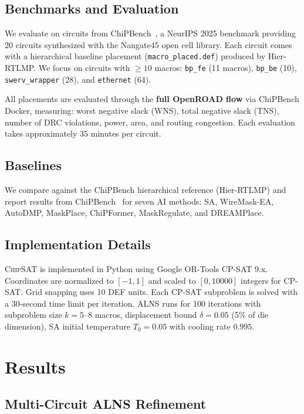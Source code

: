 \documentclass[sigconf,anonymous,review,9pt]{acmart}
\begin{document}
\subsection{Benchmarks and Evaluation}

We evaluate on circuits from ChiPBench~\cite{chipbench2025}, a NeurIPS 2025 benchmark providing 20 circuits synthesized with the Nangate45 open cell library. Each circuit comes with a hierarchical baseline placement (\texttt{macro\_placed.def}) produced by Hier-RTLMP. We focus on circuits with $\geq 10$ macros: \texttt{bp\_fe} (11 macros), \texttt{bp\_be} (10), \texttt{swerv\_wrapper} (28), and \texttt{ethernet} (64).

All placements are evaluated through the \textbf{full OpenROAD flow} via ChiPBench Docker, measuring: worst negative slack (WNS), total negative slack (TNS), number of DRC violations, power, area, and routing congestion. Each evaluation takes approximately 35 minutes per circuit.

\subsection{Baselines}

We compare against the ChiPBench hierarchical reference (Hier-RTLMP) and report results from ChiPBench~\cite{chipbench2025} for seven AI methods: SA, WireMask-EA, AutoDMP, MaskPlace, ChiPFormer, MaskRegulate, and DREAMPlace.

\subsection{Implementation Details}

\textsc{ChipSAT} is implemented in Python using Google OR-Tools CP-SAT 9.x. Coordinates are normalized to $[-1, 1]$ and scaled to $[0, 10000]$ integers for CP-SAT. Grid snapping uses 10 DEF units. Each CP-SAT subproblem is solved with a 30-second time limit per iteration. ALNS runs for 100 iterations with subproblem size $k = 5$--$8$ macros, displacement bound $\delta = 0.05$ (5\% of die dimension), SA initial temperature $T_0 = 0.05$ with cooling rate $0.995$.


\section{Results}
\label{sec:results}

\subsection{Multi-Circuit ALNS Refinement}
\label{subsec:main_results}
\end{document}
